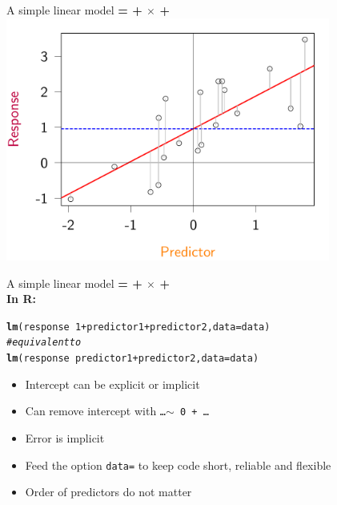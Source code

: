 \documentclass[10pt]{beamer}\usepackage[]{graphicx}\usepackage[]{color}
\makeatletter
\newcommand{\hlnum}[1]{\textcolor[rgb]{0.686,0.059,0.569}{#1}}%
\newcommand{\hlcom}[1]{\textcolor[rgb]{0.678,0.584,0.686}{\textit{#1}}}%
\newcommand{\hlopt}[1]{\textcolor[rgb]{0,0,0}{#1}}%
\newcommand{\hlstd}[1]{\textcolor[rgb]{0.345,0.345,0.345}{#1}}%
\newcommand{\hlkwc}[1]{\textcolor[rgb]{0.333,0.667,0.333}{#1}}%
\newcommand{\hlkwd}[1]{\textcolor[rgb]{0.737,0.353,0.396}{\textbf{#1}}}%
\newenvironment{kframe}{%
 \def\at@end@of@kframe{}%
 \ifinner\ifhmode%
  \def\at@end@of@kframe{\end{minipage}}%
  \begin{minipage}{\columnwidth}%
 \fi\fi%
 \def\FrameCommand##1{\hskip\@totalleftmargin \hskip-\fboxsep
 \colorbox{shadecolor}{##1}\hskip-\fboxsep
     \hskip-\linewidth \hskip-\@totalleftmargin \hskip\columnwidth}%
 \MakeFramed {\advance\hsize-\width
   \@totalleftmargin\z@ \linewidth\hsize
   \@setminipage}}%
 {\par\unskip\endMakeFramed%
 \at@end@of@kframe}
\newenvironment{knitrout}{}{} %
\makeatother
\begin{document}
\begin{frame}[fragile]{A simple linear model}
  \textbf{{\color{purple}{Response}} = {\color{blue}{Intercept}} + {\color{red}{Slope}} $\times$ {\color{orange}{Predictor}} + {\color{gray}{Error}}} \\
  
\begin{knitrout}
\color{fgcolor}
\includegraphics[width=0.8\textwidth,height=0.6\textwidth]{figure/lmprinc-1} 

\end{knitrout}
\end{frame}

\begin{frame}[fragile]{A simple linear model}
  \textbf{{\color{purple}{Response}} = {\color{blue}{Intercept}} + {\color{red}{Slope}} $\times$ {\color{orange}{Predictor}} + {\color{gray}{Error}}} \\
  \vspace{1cm}
\textbf{In R:}
\begin{knitrout}
\color{fgcolor}\begin{kframe}
\begin{alltt}
  \hlkwd{lm}\hlstd{(response} \hlopt{~} \hlnum{1} \hlopt{+} \hlstd{predictor1} \hlopt{+} \hlstd{predictor2,} \hlkwc{data}\hlstd{=data)}
    \hlcom{# equivalent to}
  \hlkwd{lm}\hlstd{(response} \hlopt{~} \hlstd{predictor1} \hlopt{+} \hlstd{predictor2,} \hlkwc{data}\hlstd{=data)}
\end{alltt}
\end{kframe}
\end{knitrout}
\begin{itemize}
  \item Intercept can be explicit or implicit
  \item Can remove intercept with \texttt{\dots $\sim $ 0 + \dots}
  \item Error is implicit
  \item Feed the option \texttt{data=} to keep code short, reliable and flexible
  \item Order of predictors do not matter 
\end{itemize}

\end{frame}
\end{document}
